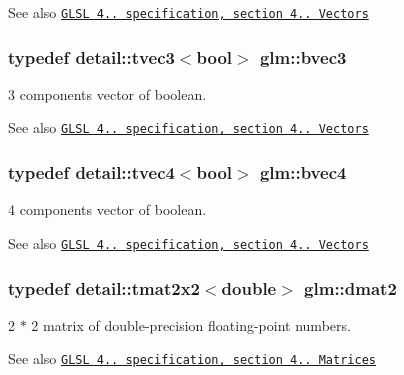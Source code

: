 \begin{DoxySeeAlso}{See also}
\href{http://www.opengl.org/registry/doc/GLSLangSpec.4.20.8.pdf}{\tt G\+L\+S\+L 4.. specification, section 4.. Vectors} 
\end{DoxySeeAlso}
\hypertarget{group__core__types_gac192f5fbd7fcb78ca703d4684f323512}{}
\subsubsection[{bvec3}]{\setlength{\rightskip}{0pt plus 5cm}typedef detail\+::tvec3$<$bool$>$ {\bf glm\+::bvec3}}\label{group__core__types_gac192f5fbd7fcb78ca703d4684f323512}
3 components vector of boolean.

\begin{DoxySeeAlso}{See also}
\href{http://www.opengl.org/registry/doc/GLSLangSpec.4.20.8.pdf}{\tt G\+L\+S\+L 4.. specification, section 4.. Vectors} 
\end{DoxySeeAlso}
\hypertarget{group__core__types_ga8ec34c649bc4513202aff479486bbcea}{}
\subsubsection[{bvec4}]{\setlength{\rightskip}{0pt plus 5cm}typedef detail\+::tvec4$<$bool$>$ {\bf glm\+::bvec4}}\label{group__core__types_ga8ec34c649bc4513202aff479486bbcea}
4 components vector of boolean.

\begin{DoxySeeAlso}{See also}
\href{http://www.opengl.org/registry/doc/GLSLangSpec.4.20.8.pdf}{\tt G\+L\+S\+L 4.. specification, section 4.. Vectors} 
\end{DoxySeeAlso}
\hypertarget{group__core__types_gaa53909085d199392937e3933af5410a1}{}
\subsubsection[{dmat2}]{\setlength{\rightskip}{0pt plus 5cm}typedef detail\+::tmat2x2$<$double$>$ {\bf glm\+::dmat2}}\label{group__core__types_gaa53909085d199392937e3933af5410a1}
2 $\ast$ 2 matrix of double-\/precision floating-\/point numbers.

\begin{DoxySeeAlso}{See also}
\href{http://www.opengl.org/registry/doc/GLSLangSpec.4.20.8.pdf}{\tt G\+L\+S\+L 4.. specification, section 4.. Matrices} 
\end{DoxySeeAlso}
\hypertarget{group__core__types_ga2c1de969d1d8cfcb297dbfa476b33dc8}{}
